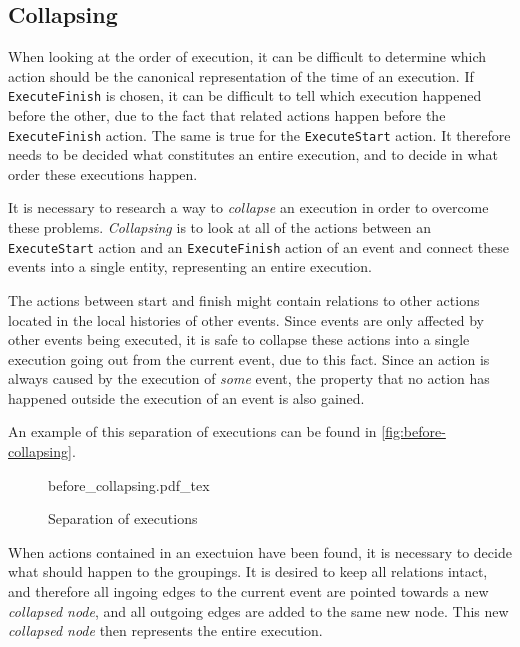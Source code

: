 	\subsection{Collapsing}
	When looking at the order of execution, it can be difficult to determine which action should be the canonical representation of the time of an execution. If \texttt{ExecuteFinish} is chosen, it can be difficult to tell which execution happened before the other, due to the fact that related actions happen before the \texttt{ExecuteFinish} action. 
	The same is true for the \texttt{ExecuteStart} action. It therefore needs to be decided what constitutes an entire execution, and to decide in what order these executions happen.
	
	\newpar It is necessary to research a way to \textit{collapse} an execution in order to overcome these problems. \textit{Collapsing} is to look at all of the actions between an \texttt{ExecuteStart} action and an \texttt{ExecuteFinish} action of an event and connect these events into a single entity, representing an entire execution. 
	
	The actions between start and finish might contain relations to other actions located in the local histories of other events. Since events are only affected by other events being executed, it is safe to collapse these actions into a single execution going out from the current event, due to this fact. Since an action is always caused by the execution of \textit{some} event, the property that no action has happened outside the execution of an event is also gained. 
	
	An example of this separation of executions can be found in \autoref{fig:before-collapsing}.
	
	\begin{figure}
		\centering
		\def\svgwidth{0.42\columnwidth}
		\fontsize{6}{8}\selectfont
		{before_collapsing.pdf_tex}
		\caption{Separation of executions}
		\label{fig:before-collapsing}
	\end{figure}
	
	\newpar When actions contained in an exectuion have been found, it is necessary to decide what should happen to the groupings. It is desired to keep all relations intact, and therefore all ingoing edges to the current event are pointed towards a new \textit{collapsed node}, and all outgoing edges are added to the same new node. This new \textit{collapsed node} then represents the entire execution. 
	
